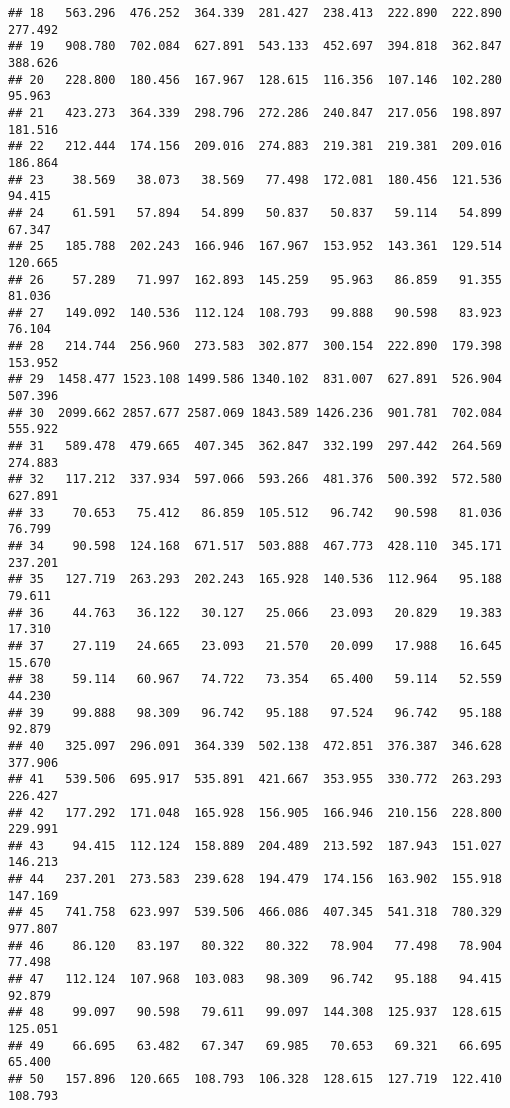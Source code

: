 \documentclass[
]{article}
\begin{document}
\begin{verbatim}
## 18   563.296  476.252  364.339  281.427  238.413  222.890  222.890  277.492
## 19   908.780  702.084  627.891  543.133  452.697  394.818  362.847  388.626
## 20   228.800  180.456  167.967  128.615  116.356  107.146  102.280   95.963
## 21   423.273  364.339  298.796  272.286  240.847  217.056  198.897  181.516
## 22   212.444  174.156  209.016  274.883  219.381  219.381  209.016  186.864
## 23    38.569   38.073   38.569   77.498  172.081  180.456  121.536   94.415
## 24    61.591   57.894   54.899   50.837   50.837   59.114   54.899   67.347
## 25   185.788  202.243  166.946  167.967  153.952  143.361  129.514  120.665
## 26    57.289   71.997  162.893  145.259   95.963   86.859   91.355   81.036
## 27   149.092  140.536  112.124  108.793   99.888   90.598   83.923   76.104
## 28   214.744  256.960  273.583  302.877  300.154  222.890  179.398  153.952
## 29  1458.477 1523.108 1499.586 1340.102  831.007  627.891  526.904  507.396
## 30  2099.662 2857.677 2587.069 1843.589 1426.236  901.781  702.084  555.922
## 31   589.478  479.665  407.345  362.847  332.199  297.442  264.569  274.883
## 32   117.212  337.934  597.066  593.266  481.376  500.392  572.580  627.891
## 33    70.653   75.412   86.859  105.512   96.742   90.598   81.036   76.799
## 34    90.598  124.168  671.517  503.888  467.773  428.110  345.171  237.201
## 35   127.719  263.293  202.243  165.928  140.536  112.964   95.188   79.611
## 36    44.763   36.122   30.127   25.066   23.093   20.829   19.383   17.310
## 37    27.119   24.665   23.093   21.570   20.099   17.988   16.645   15.670
## 38    59.114   60.967   74.722   73.354   65.400   59.114   52.559   44.230
## 39    99.888   98.309   96.742   95.188   97.524   96.742   95.188   92.879
## 40   325.097  296.091  364.339  502.138  472.851  376.387  346.628  377.906
## 41   539.506  695.917  535.891  421.667  353.955  330.772  263.293  226.427
## 42   177.292  171.048  165.928  156.905  166.946  210.156  228.800  229.991
## 43    94.415  112.124  158.889  204.489  213.592  187.943  151.027  146.213
## 44   237.201  273.583  239.628  194.479  174.156  163.902  155.918  147.169
## 45   741.758  623.997  539.506  466.086  407.345  541.318  780.329  977.807
## 46    86.120   83.197   80.322   80.322   78.904   77.498   78.904   77.498
## 47   112.124  107.968  103.083   98.309   96.742   95.188   94.415   92.879
## 48    99.097   90.598   79.611   99.097  144.308  125.937  128.615  125.051
## 49    66.695   63.482   67.347   69.985   70.653   69.321   66.695   65.400
## 50   157.896  120.665  108.793  106.328  128.615  127.719  122.410  108.793

\end{verbatim}
\end{document}
